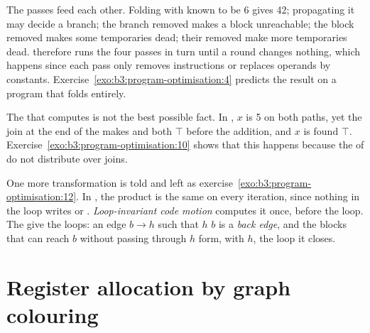 \label{lst:b3:program-optimisation:dce}

The passes feed each other. Folding  with  known to be 6 gives 42; propagating it may decide a branch; the branch removed makes a block unreachable; the block removed makes some temporaries dead; their  removed make more temporaries dead.  therefore runs the four passes in turn until a round changes nothing, which happens since each pass only removes instructions or replaces operands by constants. Exercise~\ref{exo:b3:program-optimisation:4} predicts the result on a program that folds entirely.

\begin{remark}
The  that  computes is not the best possible fact. In , $x$ is 5 on both paths, yet the join at the end of the  makes  and  both $\top$ before the addition, and $x$ is found $\top$. Exercise~\ref{exo:b3:program-optimisation:10} shows that this happens because the  of  do not distribute over joins.
\end{remark}

One more transformation is told and left as exercise~\ref{exo:b3:program-optimisation:12}. In , the product  is the same on every iteration, since nothing in the loop writes  or . \emph{Loop-invariant code motion} computes it once, before the loop. The  give the loops: an edge $b \to h$ such that $h$  $b$ is a \emph{back edge}, and the blocks that can reach $b$ without passing through $h$ form, with $h$, the loop it closes.

\section{Register allocation by graph colouring}\label{sec:b3:program-optimisation:regalloc}

